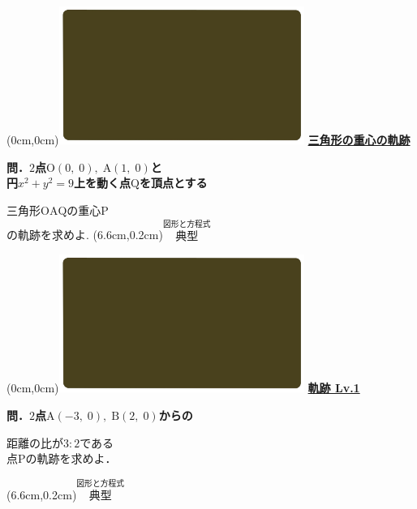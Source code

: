 \documentclass[10pt,
fleqn,
dvipdfmx,
uplatex
]{jsarticle}
\begin{document}
\at(0cm,0cm){\includegraphics[width=8cm,bb=0 0 1920 1080]{./youtube/thumbnails/templates/smart_background/図形と方程式.jpeg}}
{\color{orange}\bf\boldmath\LARGE\underline{三角形の重心の軌跡}}\vspace{0.3zw}

\normalsize
\bf\boldmath 問．$2$点$\text{O}\left(0,\;0\right),\;\text{A}\left(1,\;0\right)$と\\
\hfill 円$x^2+y^2=9$上を動く点$\text{Q}$を頂点とする

\huge
\hspace{0.0zw}三角形$\text{OAQ}$の重心$\text{P}$\\
\hfill の軌跡を求めよ.
\at(6.6cm,0.2cm){\small\color{bradorange}$\overset{\text{図形と方程式}}{\text{典型}}$}

\newpage

\at(0cm,0cm){\includegraphics[width=8cm,bb=0 0 1920 1080]{./youtube/thumbnails/templates/smart_background/図形と方程式.jpeg}}
{\color{orange}\bf\boldmath\huge\underline{軌跡 Lv.1}}\vspace{0.5zw}

\large 
\bf\boldmath 問．$2$点$\text{A}\left(-3,\;0\right),\;\text{B}\left(2,\;0\right)$からの

\huge
\vspace{0.2zw}
\hspace{0.0zw}
距離の比が$3:2$である\\
\hfill 点$\text{P}$の軌跡を求めよ．

\at(6.6cm,0.2cm){\small\color{bradorange}$\overset{\text{図形と方程式}}{\text{典型}}$}

\newpage
\end{document}
